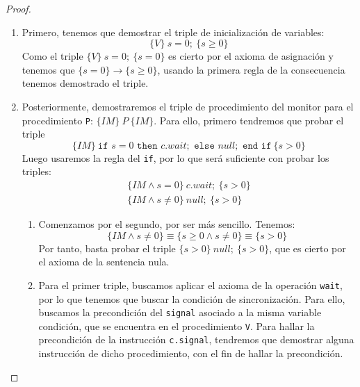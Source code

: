 \begin{ejemplo}
\begin{proof}
        \begin{enumerate}
            \item Primero, tenemos que demostrar el triple de inicialización de variables:
                \begin{equation*}
                    \{V\}\ s=0;\ \{s\geq 0\}
                \end{equation*}
                Como el triple $\{V\}\ s=0;\ \{s=0\}$ es cierto por el axioma de asignación y tenemos que $\{s=0\}\rightarrow\{s\geq 0\}$, usando la primera regla de la consecuencia tenemos demostrado el triple.
            \item Posteriormente, demostraremos el triple de procedimiento del monitor para el procedimiento \verb|P|: $\{IM\}\ P\ \{IM\}$. Para ello, primero tendremos que probar el triple
                \begin{equation*}
                    \{IM\}\ \texttt{if\ }s=0\texttt{\ then\ }c.wait;\texttt{\ else\ }null;\texttt{\ end if}\ \{s>0\}
                \end{equation*}
                Luego usaremos la regla del \verb|if|, por lo que será suficiente con probar los triples:
                \begin{gather*}
                    \{IM \land s=0\}\ c.wait;\ \{s>0\} \\
                    \{IM \land s\neq0\}\ null;\ \{s>0\}
                \end{gather*}
                \begin{enumerate}
                    \item Comenzamos por el segundo, por ser más sencillo. Tenemos:
                        \begin{equation*}
                            {\{IM \land s\neq0\} \equiv \{s\geq 0 \land s\neq0\}\equiv \{s>0\}}
                        \end{equation*}
                        Por tanto, basta probar el triple ${\{s>0\}\ null;\ \{s>0\}}$, que es cierto por el axioma de la sentencia nula.
                    \item Para el primer triple, buscamos aplicar el axioma de la operación \verb|wait|, por lo que tenemos que buscar la condición de sincronización. Para ello, buscamos la precondición del \verb|signal| asociado a la misma variable condición, que se encuentra en el procedimiento \verb|V|. Para hallar la precondición de la instrucción \verb|c.signal|, tendremos que demostrar alguna instrucción de dicho procedimiento, con el fin de hallar la precondición.


\end{enumerate}
\end{enumerate}
\end{proof}
\end{ejemplo}
